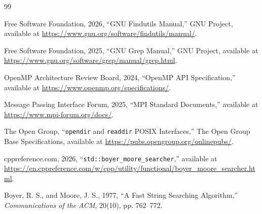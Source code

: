 \documentclass[twocolumn,10pt]{asme2e}
\begin{document}
\begin{thebibliography}{99}

Free Software Foundation, 2026, ``GNU Findutils Manual,'' GNU Project, available at \url{https://www.gnu.org/software/findutils/manual/}.

Free Software Foundation, 2025, ``GNU Grep Manual,'' GNU Project, available at \url{https://www.gnu.org/software/grep/manual/grep.html}.

OpenMP Architecture Review Board, 2024, ``OpenMP API Specification,'' available at \url{https://www.openmp.org/specifications/}.

Message Passing Interface Forum, 2025, ``MPI Standard Documents,'' available at \url{https://www.mpi-forum.org/docs/}.

The Open Group, ``\texttt{opendir} and \texttt{readdir} POSIX Interfaces,'' The Open Group Base Specifications, available at \url{https://pubs.opengroup.org/onlinepubs/}.

cppreference.com, 2026, ``\texttt{std::boyer\_moore\_searcher},'' available at \url{https://en.cppreference.com/w/cpp/utility/functional/boyer_moore_searcher.html}.

Boyer, R. S., and Moore, J. S., 1977, ``A Fast String Searching Algorithm,'' \textit{Communications of the ACM}, 20(10), pp. 762--772.

\end{thebibliography}
\end{document}
